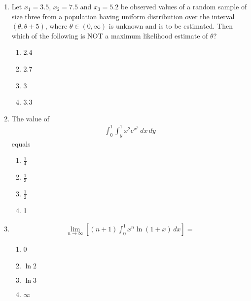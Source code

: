 \documentclass[journal]{IEEEtran}
\numberwithin{equation}{enumi}
\numberwithin{figure}{enumi}
\begin{document}
\begin{enumerate}
\item Let $x_1 = 3.5$, $x_2 = 7.5$ and $x_3 = 5.2$ be observed values of a random sample of size three from a population having uniform distribution over the interval $(\theta, \theta + 5)$, where $\theta \in (0, \infty)$ is unknown and is to be estimated. Then which of the following is NOT a maximum likelihood estimate of $\theta$?
\hfill{}
\begin{multicols}{4}
\begin{enumerate}
    \item 2.4
    \item 2.7
    \item 3
    \item 3.3
\end{enumerate}
\end{multicols}


\item The value of 
\begin{align*}
\int_0^1 \int_y^1 x^2 e^{x^2} \, dx \, dy
\end{align*}
equals
\hfill{}
\begin{multicols}{4}
\begin{enumerate}
    \item $\frac{1}{4}$
    \item $\frac{1}{3}$
    \item $\frac{1}{2}$
    \item 1
\end{enumerate}
\end{multicols}



\item 
\begin{align*}
\lim_{n \to \infty} \left[ (n+1) \int_0^1 x^n \ln(1+x) \, dx \right] =
\end{align*}
\hfill{}
\begin{multicols}{4}
\begin{enumerate}
    \item 0
    \item $\ln 2$
    \item $\ln 3$
    \item $\infty$
\end{enumerate}
\end{multicols}




\end{enumerate}
\end{document}
